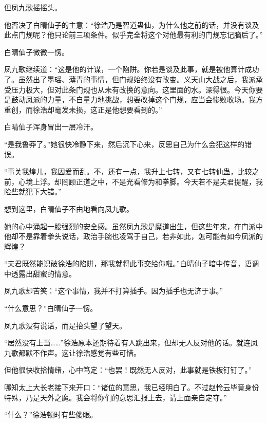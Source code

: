 \begin{this_body}
但凤九歌摇摇头。

他否决了白晴仙子的主意：“徐浩乃是智道蛊仙，为什么他之前的话，并没有谈及此点门规呢？他只论前三项条件。似乎完全将这个对他最有利的门规忘记脑后了。”

白晴仙子微微一愣。

凤九歌继续道：“这是他的计谋，一个陷阱。你若是谈及此事，就是被他算计成功了。虽然出了墨瑶、薄青的事情，但门规始终没有改变。义天山大战之后，我派承受压力极大，但对此条门规也从未有改换的意向。这里面的水。深得很。今天你要是鼓动凤派的力量，不自量力地挑战，想要改掉这个门规，应当会惨败收场。我方重创，而徐浩却毫发未损，这正是他想要看到的。”

白晴仙子浑身冒出一层冷汗。

“是我鲁莽了。”她很快冷静下来，然后沉下心来，反思自己为什么会犯这样的错误。

“事关我煌儿，我因爱而乱。不，还有一点，我升上七转，又有七转仙蛊，比较之前，心境上浮。却罔顾正道之中，不是光看修为和拳脚。今天若不是夫君提醒，我险些就犯下大错。”

想到这里，白晴仙子不由地看向凤九歌。

她的心中涌起一股强烈的安全感。虽然凤九歌是魔道出生，但这些年来，在门派中他却不是靠着拳头说话，政治手腕也凌驾于自己，若非如此，怎可能有如今凤派的辉煌？

“夫君既然能识破徐浩的陷阱，那我就将此事交给你啦。”白晴仙子暗中传音，语调中透露出甜蜜的情意。

凤九歌却苦笑：“这个事情，我并不打算插手。因为插手也无济于事。”

“什么意思？”白晴仙子一愣。

凤九歌没有说话，而是抬头望了望天。

“居然没有上当……”徐浩原本还期待着有人跳出来，但却无人反对他的话。就连凤九歌都默不作声。这让徐浩感觉有些可惜。

但他很快收拾情绪，心中笃定：“也罢！既然无人反对，此事就是铁板钉钉了。”

哪知太上大长老接下来开口：“诸位的意思，我已经明白了。不过赵怜云毕竟身份特殊，乃是天外之魔。我会将你们的意思汇报上去，请上面亲自定夺。”

“什么？”徐浩顿时有些傻眼。

\end{this_body}


